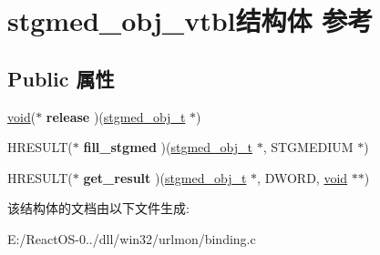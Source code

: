 \hypertarget{structstgmed__obj__vtbl}{}\section{stgmed\+\_\+obj\+\_\+vtbl结构体 参考}
\label{structstgmed__obj__vtbl}
\subsection*{Public 属性}
\begin{DoxyCompactItemize}
\item 
\mbox{\label{structstgmed__obj__vtbl_a840dbc65fb0c0872a34f33202e6e5626}} 
\hyperlink{interfacevoid}{void}($\ast$ {\bfseries release} )(\hyperlink{struct__stgmed__obj__t}{stgmed\+\_\+obj\+\_\+t} $\ast$)
\item 
\mbox{\label{structstgmed__obj__vtbl_a8c96ff073c2f6fab65f8cc430542cb49}} 
H\+R\+E\+S\+U\+LT($\ast$ {\bfseries fill\+\_\+stgmed} )(\hyperlink{struct__stgmed__obj__t}{stgmed\+\_\+obj\+\_\+t} $\ast$, S\+T\+G\+M\+E\+D\+I\+UM $\ast$)
\item 
\mbox{\label{structstgmed__obj__vtbl_ade01a991f04c8f0f44e685c43882d475}} 
H\+R\+E\+S\+U\+LT($\ast$ {\bfseries get\+\_\+result} )(\hyperlink{struct__stgmed__obj__t}{stgmed\+\_\+obj\+\_\+t} $\ast$, D\+W\+O\+RD, \hyperlink{interfacevoid}{void} $\ast$$\ast$)
\end{DoxyCompactItemize}


该结构体的文档由以下文件生成\+:\begin{DoxyCompactItemize}
\item 
E\+:/\+React\+O\+S-\/0../dll/win32/urlmon/binding.\+c\end{DoxyCompactItemize}
